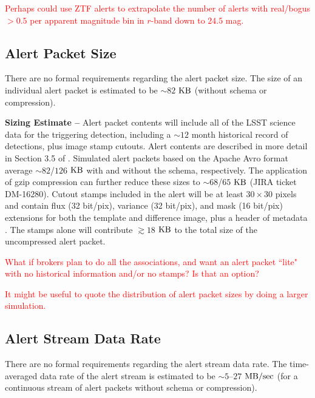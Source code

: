 \documentclass[DM,authoryear,toc]{lsstdoc}
\begin{document}
\textcolor{red}{Perhaps could use ZTF alerts to extrapolate the number of alerts with real/bogus $>0.5$ per apparent magnitude bin in $r$-band down to $24.5$ mag.}




\subsection{Alert Packet Size}\label{ssec:packet_size}

There are no formal requirements regarding the alert packet size. The size of an individual alert packet is estimated to be $\sim82$ $\rm KB$ (without schema or compression).

{\bf Sizing Estimate --} Alert packet contents will include all of the LSST science data for the triggering detection, including a $\sim12$ month historical record of detections, plus image stamp cutouts. Alert contents are described in more detail in Section 3.5 of . Simulated alert packets based on the Apache Avro format average $\sim82$/$126$ $\rm KB$ with and without the schema, respectively. The application of gzip compression can further reduce these sizes to $\sim68$/$65$ $\rm KB$ (JIRA ticket DM-16280). Cutout stamps included in the alert will be at least $30\times30$ pixels and contain flux (32 bit/pix), variance (32 bit/pix), and mask (16 bit/pix) extensions for both the template and difference image, plus a header of metadata . The stamps alone will contribute $\gtrsim18$ $\rm KB$ to the total size of the uncompressed alert packet. 

\textcolor{red}{What if brokers plan to do all the associations, and want an alert packet ``lite" with no historical information and/or no stamps? Is that an option?}

\textcolor{red}{It might be useful to quote the distribution of alert packet sizes by doing a larger simulation.}


\subsection{Alert Stream Data Rate}\label{ssec:data_rate}

There are no formal requirements regarding the alert stream data rate. The time-averaged data rate of the alert stream is estimated to be $\sim5$--$27$ $\rm MB/sec$ (for a continuous stream of alert packets without schema or compression).
\end{document}
